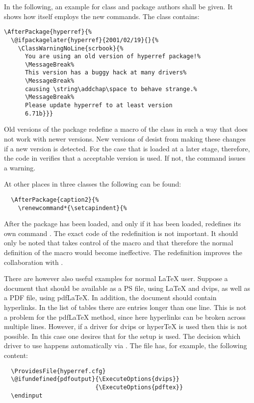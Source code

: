 \begin{Example}
  In the following, an example for class and package authors shall be
  given.  It shows how {\KOMAScript} itself employs the new commands.
  The class  contains:
\begin{lstlisting}
\AfterPackage{hyperref}{%
  \@ifpackagelater{hyperref}{2001/02/19}{}{%
    \ClassWarningNoLine{scrbook}{%
      You are using an old version of hyperref package!%
      \MessageBreak%
      This version has a buggy hack at many drivers%
      \MessageBreak%
      causing \string\addchap\space to behave strange.%
      \MessageBreak%
      Please update hyperref to at least version
      6.71b}}}
\end{lstlisting}
Old versions of the  package redefine a macro of the
 class in such a way that does not work with newer
{\KOMAScript} versions.  New versions of  desist
from making these changes if a new {\KOMAScript} version is detected.
For the case that  is loaded at a later stage,
therefore, the code in  verifies that a acceptable
 version is used.  If not, the command issues a
warning.

At other places in three {\KOMAScript} classes the following can be
found:
\begin{lstlisting}
  \AfterPackage{caption2}{%
    \renewcommand*{\setcapindent}{%
\end{lstlisting}
After the package  has been loaded, and only if it
has been loaded, {\KOMAScript} redefines its own command
.  The exact code of the redefinition is not
important.  It should only be noted that  takes
control of the  macro and that therefore the normal
definition of the  macro would become ineffective.
The redefinition improves the collaboration with .

There are however also useful examples for normal {\LaTeX} user.
Suppose a document that should be available as a PS file, using
{\LaTeX} and dvips, as well as a PDF file, using pdf\LaTeX.  In
addition, the document should contain hyperlinks.  In the list of
tables there are entries longer than one line.  This is not a problem
for the pdf\LaTeX{} method, since here hyperlinks can be broken across
multiple lines.  However, if a  driver for dvips or
hyper\TeX{} is used then this is not possible.  In this case one
desires that for the  setup  is
used. The decision which  driver to use happens
automatically via . The file has, for example, the
following content:
\begin{lstlisting}
  \ProvidesFile{hyperref.cfg}
  \@ifundefined{pdfoutput}{\ExecuteOptions{dvips}}
                          {\ExecuteOptions{pdftex}}
  \endinput
\end{lstlisting}


\end{Example}

